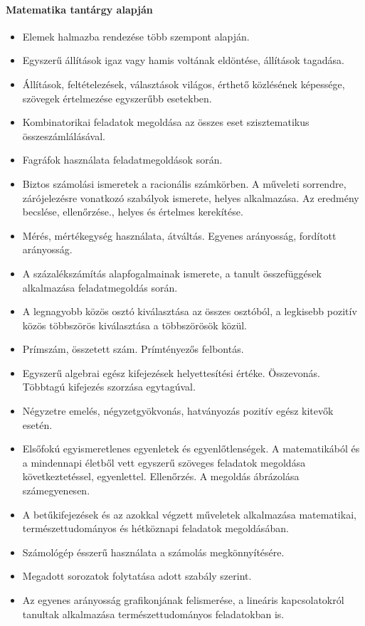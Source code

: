 \paragraph{Matematika tantárgy alapján}
\begin{itemize}
\item Elemek halmazba rendezése több szempont alapján.
\item Egyszerű állítások igaz vagy hamis voltának eldöntése, állítások tagadása.
\item Állítások, feltételezések, választások világos, érthető közlésének képessége, szövegek értelmezése egyszerűbb esetekben.
\item Kombinatorikai feladatok megoldása az összes eset szisztematikus összeszámlálásával.
\item Fagráfok használata feladatmegoldások során.
\item Biztos számolási ismeretek a racionális számkörben. A műveleti sorrendre, zárójelezésre vonatkozó szabályok ismerete, helyes alkalmazása. Az eredmény becslése, ellenőrzése., helyes és értelmes kerekítése.
\item Mérés, mértékegység használata, átváltás. Egyenes arányosság, fordított arányosság.
\item A százalékszámítás alapfogalmainak ismerete, a tanult összefüggések alkalmazása feladatmegoldás során.
\item A legnagyobb közös osztó kiválasztása az összes osztóból, a legkisebb pozitív közös többszörös kiválasztása a többszörösök közül.
\item Prímszám, összetett szám. Prímtényezős felbontás.
\item Egyszerű algebrai egész kifejezések helyettesítési értéke. Összevonás. Többtagú kifejezés szorzása egytagúval.
\item Négyzetre emelés, négyzetgyökvonás, hatványozás pozitív egész kitevők esetén.
\item Elsőfokú egyismeretlenes egyenletek és egyenlőtlenségek. A matematikából és a mindennapi életből vett egyszerű szöveges feladatok megoldása következtetéssel, egyenlettel. Ellenőrzés. A megoldás ábrázolása számegyenesen.
\item A betűkifejezések és az azokkal végzett műveletek alkalmazása matematikai, természettudományos és hétköznapi feladatok megoldásában.
\item Számológép ésszerű használata a számolás megkönnyítésére.
\item Megadott sorozatok folytatása adott szabály szerint.
\item Az egyenes arányosság grafikonjának felismerése, a lineáris kapcsolatokról tanultak alkalmazása természettudományos feladatokban is.

\end{itemize}

